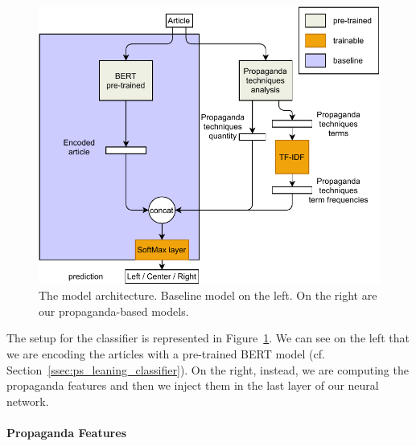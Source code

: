 \begin{figure}[!htb]
    \centering
    \includegraphics[width=\linewidth]{figures/methodology-Page-1.pdf}
    \caption{The model architecture. Baseline model on the left. On the right are our propaganda-based models.}
    \label{fig:model_classifier}
\end{figure}

The setup for the classifier is represented in Figure~\ref{fig:model_classifier}. We can see on the left that we are encoding the articles with a pre-trained BERT model (cf. Section~\ref{ssec:ps_leaning_classifier}). On the right, instead, we are computing the propaganda features and then we inject them in the last layer of our neural network.


\paragraph{Propaganda Features}


